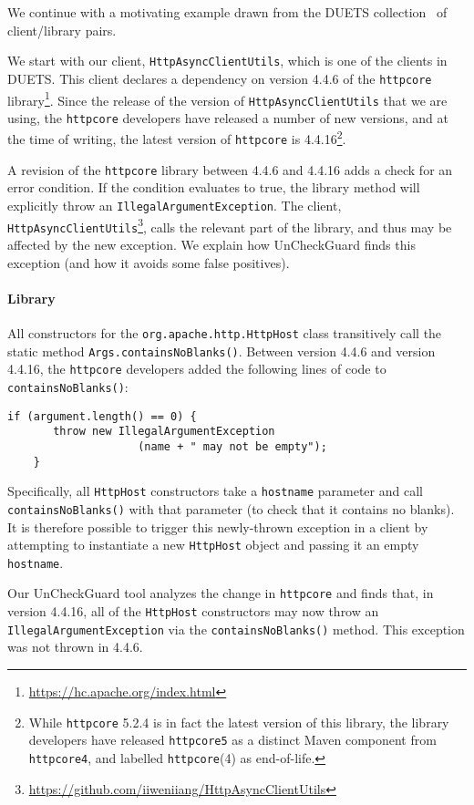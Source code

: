 We continue with a motivating example drawn from the DUETS collection~\cite{durieux21:_duets}
of client/library pairs. 

We start with our client, \texttt{HttpAsyncClientUtils}, which is one of the clients in DUETS. This client declares a dependency on
version 4.4.6 of the \texttt{httpcore} library\footnote{\url{https://hc.apache.org/index.html}}. Since the release of the version of \texttt{HttpAsyncClientUtils} that we are using, the \texttt{httpcore} developers
have released a number of new versions, and at the time of writing, the latest version of \texttt{httpcore}
is 4.4.16\footnote{While \texttt{httpcore} 5.2.4 is in fact the latest version of this library, the library developers have released \texttt{httpcore5} as a distinct Maven component from \texttt{httpcore4}, and labelled \texttt{httpcore}(4) as end-of-life.}.

A revision of the \texttt{httpcore} library between 4.4.6 and 4.4.16 adds a check for an
error condition.  If the condition evaluates to true, the library method will
explicitly throw an \texttt{IllegalArgumentException}. The client, \texttt{HttpAsyncClientUtils}\footnote{\url{https://github.com/iiweniiang/HttpAsyncClientUtils}},
calls the relevant part of the library, and thus may be affected by the new exception. We explain how UnCheckGuard finds this exception (and how it avoids some false positives).


\paragraph{Library} All constructors for the \texttt{org.apache.http.HttpHost} class transitively call
the static method \texttt{Args.containsNoBlanks()}. Between version 4.4.6 and version 4.4.16, the \texttt{httpcore}
developers added the following lines of code to \texttt{containsNoBlanks()}:
\begin{lstlisting}[style=javacode]
    if (argument.length() == 0) {
       throw new IllegalArgumentException
                    (name + " may not be empty");
    }
\end{lstlisting}
Specifically, all \texttt{HttpHost} constructors take a \texttt{hostname} parameter and call \texttt{containsNoBlanks()}
with that parameter (to check that it contains no blanks). It is therefore possible to trigger this newly-thrown
exception in a client by attempting to instantiate a new \texttt{HttpHost} object and passing it an empty
\texttt{hostname}.

Our UnCheckGuard tool analyzes the change in \texttt{httpcore} and finds that, in
version 4.4.16, all of the \texttt{HttpHost} constructors may now throw an
\texttt{IllegalArgumentException} via the \texttt{containsNoBlanks()} method.
This exception was not thrown in 4.4.6.

